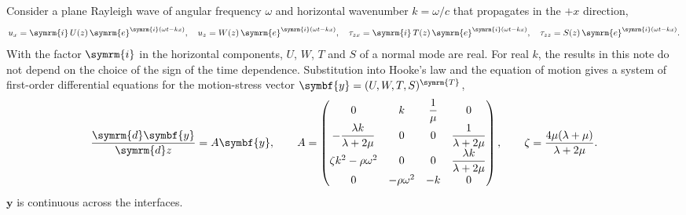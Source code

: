 \documentclass[a4paper, 10pt]{article}
\begin{document}
Consider a plane Rayleigh wave of angular frequency $\omega$ and horizontal wavenumber $k = \omega / c$ that propagates in the $+x$ direction,
\begin{align}
  u_x = \symrm{i}\, U(z)\, \symrm{e}^{\symrm{i}(\omega t - kx)}, \quad
  u_z = W(z)\, \symrm{e}^{\symrm{i}(\omega t - kx)}, \quad
  \tau_{zx} = \symrm{i}\, T(z)\, \symrm{e}^{\symrm{i}(\omega t - kx)}, \quad
  \tau_{zz} = S(z)\, \symrm{e}^{\symrm{i}(\omega t - kx)}.
\end{align}
With the factor $\symrm{i}$ in the horizontal components, $U$, $W$, $T$ and $S$ of a normal mode are real.
For real $k$, the results in this note do not depend on the choice of the sign of the time dependence.
Substitution into Hooke's law and the equation of motion gives a system of first-order differential equations for the motion-stress vector $\symbf{y} = (U, W, T, S)^{\symrm{T}}$,
\begin{align}
  \frac{\symrm{d} \symbf{y}}{\symrm{d} z} = A \symbf{y},
  \qquad
  A =
  \begin{pmatrix}
    0 & k & \dfrac{1}{\mu} & 0 \\[2mm]
    -\dfrac{\lambda k}{\lambda + 2\mu} & 0 & 0 & \dfrac{1}{\lambda + 2\mu} \\[2mm]
    \zeta k^2 - \rho \omega^2 & 0 & 0 & \dfrac{\lambda k}{\lambda + 2\mu} \\[2mm]
    0 & -\rho \omega^2 & -k & 0
  \end{pmatrix},
  \qquad
  \zeta = \frac{4 \mu (\lambda + \mu)}{\lambda + 2 \mu}.
\end{align}
$\symbf{y}$ is continuous across the interfaces.
\end{document}
